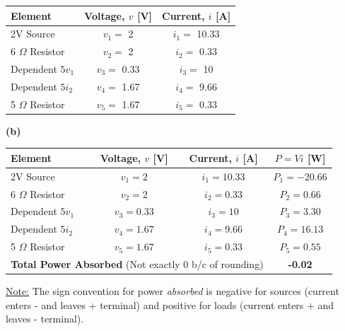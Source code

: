 \documentclass[12pt]{article}
\begin{document}
\begin{table}[H]
\centering
\renewcommand{\arraystretch}{1.5}
\begin{tabular}{|l|c|c|}
\hline
\textbf{Element} & \textbf{Voltage, $v$ [V]} & \textbf{Current, $i$ [A]} \\ \hline
2V Source &$v_1=$ 2 &$i_1=$ 10.33 \\ \hline
6 $\Omega$ Resistor &$v_2=$ 2 &$i_2=$ 0.33 \\ \hline
Dependent $5v_1$ &$v_3=$ 0.33 &$i_3=$ 10 \\ \hline
Dependent $5i_2$ &$v_4=$ 1.67 &$i_4=$ 9.66 \\ \hline
5 $\Omega$ Resistor &$v_5=$ 1.67 &$i_5=$ 0.33 \\ \hline
\end{tabular}
\end{table}\newpage\noindent\vspace{-2em}
\textbf{(b)}
\begin{table}[H]
\centering
\renewcommand{\arraystretch}{1.5} 
\begin{tabular}{|l|c|c|c|}
\hline
\textbf{Element} & \textbf{Voltage, $v$ [V]} & \textbf{Current, $i$ [A]} & \textbf{$P=Vi$ [W]} \\ \hline
2V Source & $v_1=2$ & $i_1=10.33$ & $P_1 = -20.66$ \\ \hline
6 $\Omega$ Resistor & $v_2=2$ & $i_2=0.33$ & $P_2 = 0.66$ \\ \hline
Dependent $5v_1$ & $v_3=0.33$ & $i_3=10$ & $P_3 = 3.30$ \\ \hline
Dependent $5i_2$ & $v_4=1.67$ & $i_4=9.66$ & $P_4 = 16.13$ \\ \hline
5 $\Omega$ Resistor & $v_5=1.67$ & $i_5=0.33$ & $P_5 = 0.55$ \\ \hline
\multicolumn{3}{|l|}{\textbf{Total Power Absorbed} (Not exactly 0 b/c of rounding)} & \textbf{-0.02} \\ \hline
\end{tabular}
\end{table}\noindent
\underline{Note:} The sign convention for power \textit{absorbed} is negative for sources (current enters - and leaves + terminal) and positive for loads (current enters + and leaves - terminal).
\end{document}

